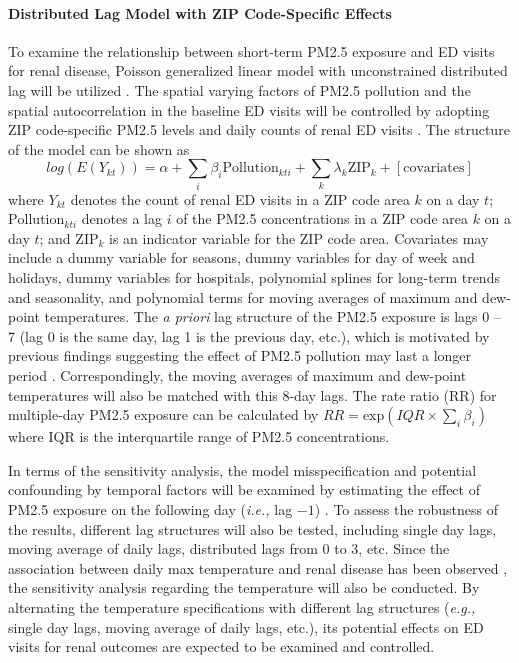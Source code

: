 \documentclass[11pt]{article}
\begin{document}
\paragraph{Distributed Lag Model with ZIP Code-Specific Effects}
To examine the relationship between short-term PM2.5 exposure and ED visits for renal disease, Poisson generalized linear model with unconstrained distributed lag will be utilized \citep{Gass2015}. The spatial varying factors of PM2.5 pollution and the spatial autocorrelation in the baseline ED visits will be controlled by adopting ZIP code-specific PM2.5 levels and daily counts of renal ED visits \citep{Sarnat2013}. The structure of the model can be shown as
\begin{equation}
\label{emu:log}
log(E(Y_{kt}))=\alpha+\sum_i\beta_i\mathrm{Pollution}_{kti}+\sum_k\lambda_k\mathrm{ZIP}_k+[\mathrm{covariates}]
\end{equation}
where $Y_{kt}$ denotes the count of renal ED visits in a ZIP code area $k$ on a day $t$; $\mathrm{Pollution}_{kti}$ denotes a lag $i$ of the PM2.5 concentrations in a ZIP code area $k$ on a day $t$; and $\mathrm{ZIP}_k$ is an indicator variable for the ZIP code area. Covariates may include a dummy variable for seasons, dummy variables for day of week and holidays, dummy variables for hospitals, polynomial splines for long-term trends and seasonality, and polynomial terms for moving averages of maximum and dew-point temperatures. The \textit{a priori} lag structure of the PM2.5 exposure is lags 0 -- 7 (lag 0 is the same day, lag 1 is the previous day, etc.), which is motivated by previous findings suggesting the effect of PM2.5 pollution may last a longer period \citep{Sarnat2015, Ye2017}. Correspondingly, the moving averages of maximum and dew-point temperatures will also be matched with this 8-day lags. The rate ratio (RR) for multiple-day PM2.5 exposure can be calculated by $RR=\mathrm{exp}⁡(IQR\times\sum_i\beta_i)$ where IQR is the interquartile range of PM2.5 concentrations. 

In terms of the sensitivity analysis, the model misspecification and potential confounding by temporal factors will be examined by estimating the effect of PM2.5 exposure on the following day (\textit{i.e.,} lag $-1$) \citep{Flanders2011, Sarnat2015}. To assess the robustness of the results, different lag structures will also be tested, including single day lags, moving average of daily lags, distributed lags from 0 to 3, etc. Since the association between daily max temperature and renal disease has been observed \citep{Winquist2016}, the sensitivity analysis regarding the temperature will also be conducted. By alternating the temperature specifications with different lag structures (\textit{e.g.,} single day lags, moving average of daily lags, etc.), its potential effects on ED visits for renal outcomes are expected to be examined and controlled.
\end{document}

